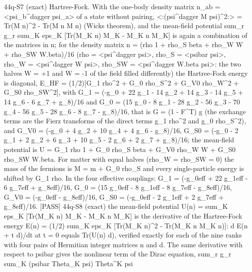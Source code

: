 \documentclass[
  10pt,
]{article}
\newenvironment{Shaded}{}{}
\newcommand{\NormalTok}[1]{#1}
\begin{document}
\begin{Shaded}
\begin{Highlighting}[]
\NormalTok{[PASS] 44q{-}S7  (exact) Hartree{-}Fock. With the one{-}body density matrix n\_ab = \textless{}psi\_b\^{}dagger psi\_a\textgreater{} of a state without pairing, \textless{}:(psi\^{}dagger M psi)\^{}2:\textgreater{} = Tr(M n)\^{}2 {-} Tr(M n M n) (Wick\textquotesingle{}s theorem), and the mean{-}field potential sum\_r g\_r sum\_K eps\_K [Tr(M\_K n) M\_K {-} M\_K n M\_K] is again a combination of the matrices in n; for the density matrix n = (rho 1 + rho\_S beta + rho\_W W + rho\_SW W.beta)/16 (rho = \textless{}psi\^{}dagger psi\textgreater{}, rho\_S = \textless{}psibar psi\textgreater{}, rho\_W = \textless{}psi\^{}dagger W psi\textgreater{}, rho\_SW = \textless{}psi\^{}dagger W.beta psi\textgreater{}: the two halves W = +1 and W = {-}1 of the field filled differently) the Hartree{-}Fock energy is diagonal, E\_HF = (1/2)[G\_1 rho\^{}2 + G\_0 rho\_S\^{}2 + G\_V0 rho\_W\^{}2 + G\_S0 rho\_SW\^{}2], with G\_1 = ({-}g\_0 + 22 g\_1 {-} 14 g\_2 + 14 g\_3 {-} 14 g\_5 + 14 g\_6 {-} 6 g\_7 + g\_8)/16 and G\_0 = (15 g\_0 {-} 8 g\_1 {-} 28 g\_2 {-} 56 g\_3 {-} 70 g\_4 {-} 56 g\_5 {-} 28 g\_6 {-} 8 g\_7 {-} g\_8)/16, that is G = (1 {-} F\^{}T) g (the exchange terms are the Fierz transforms of the direct terms g\_1 rho\^{}2 and g\_0 rho\_S\^{}2), and G\_V0 = ({-}g\_0 + 4 g\_2 + 10 g\_4 + 4 g\_6 {-} g\_8)/16, G\_S0 = ({-}g\_0 {-} 2 g\_1 + 2 g\_2 + 6 g\_3 + 10 g\_5 {-} 2 g\_6 + 2 g\_7 + g\_8)/16; the mean{-}field potential is U = G\_1 rho 1 + G\_0 rho\_S beta + G\_V0 rho\_W W + G\_S0 rho\_SW W.beta. For matter with equal halves (rho\_W = rho\_SW = 0) the mass of the fermions is M = m + G\_0 rho\_S and every single{-}particle energy is shifted by G\_1 rho. In the four effective couplings: G\_1 = ({-}g\_0eff + 22 g\_1eff {-} 6 g\_7eff + g\_8eff)/16, G\_0 = (15 g\_0eff {-} 8 g\_1eff {-} 8 g\_7eff {-} g\_8eff)/16, G\_V0 = ({-}g\_0eff {-} g\_8eff)/16, G\_S0 = ({-}g\_0eff {-} 2 g\_1eff + 2 g\_7eff + g\_8eff)/16.}
\NormalTok{[PASS] 44q{-}S8  (exact) the mean{-}field potential U(n) = sum\_K eps\_K [Tr(M\_K n) M\_K {-} M\_K n M\_K] is the derivative of the Hartree{-}Fock energy E(n) = (1/2) sum\_K eps\_K [Tr(M\_K n)\^{}2 {-} Tr(M\_K n M\_K n)]: d E(n + t d)/dt at t = 0 equals Tr(U(n) d), verified exactly for each of the nine ranks with four pairs of Hermitian integer matrices n and d. The same derivative with respect to psibar gives the nonlinear term of the Dirac equation, sum\_r g\_r sum\_K (psibar Theta\_K psi) Theta\^{}K psi}

\end{Highlighting}
\end{Shaded}
\end{document}
